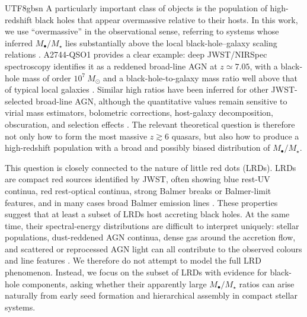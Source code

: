 \documentclass[trackchanges, twocolappendix, twocolumn]{aastex701}
\begin{document}
\begin{CJK*}{UTF8}{gbsn}
A particularly important class of objects is the population of high-redshift black holes that appear overmassive relative to their hosts. In this work, we use ``overmassive'' in the observational sense, referring to systems whose inferred $M_{\bullet}/M_\star$ lies substantially above the local black-hole--galaxy scaling relations \citep[e.g.,][]{KormendyHo2013, ReinesVolonteri2015}. A2744-QSO1 provides a clear example: deep JWST/NIRSpec spectroscopy identifies it as a reddened broad-line AGN at $z \simeq 7.05$, with a black-hole mass of order $10^7~M_\odot$ and a black-hole-to-galaxy mass ratio well above that of typical local galaxies \citep{Furtak+2024A2744QSO1}. Similar high ratios have been inferred for other JWST-selected broad-line AGN, although the quantitative values remain sensitive to virial mass estimators, bolometric corrections, host-galaxy decomposition, obscuration, and selection effects \citep{Pacucci+2023, Harikane+2023, Greene+2024}. The relevant theoretical question is therefore not only how to form the most massive $z \gtrsim 6$ quasars, but also how to produce a high-redshift population with a broad and possibly biased distribution of $M_{\bullet}/M_\star$.

This question is closely connected to the nature of little red dots (LRDs). LRDs are compact red sources identified by JWST, often showing blue rest-UV continua, red rest-optical continua, strong Balmer breaks or Balmer-limit features, and in many cases broad Balmer emission lines \citep{Labbe+2023, Matthee+2024, Kocevski+2024, Greene+2024}. These properties suggest that at least a subset of LRDs host accreting black holes. At the same time, their spectral-energy distributions are difficult to interpret uniquely: stellar populations, dust-reddened AGN continua, dense gas around the accretion flow, and scattered or reprocessed AGN light can all contribute to the observed colours and line features \citep{Setton+2024, InayoshiMaiolino2025, Brooks+2024}. We therefore do not attempt to model the full LRD phenomenon. Instead, we focus on the subset of LRDs with evidence for black-hole components, asking whether their apparently large $M_{\bullet}/M_\star$ ratios can arise naturally from early seed formation and hierarchical assembly in compact stellar systems.


\end{CJK*}
\end{document}
